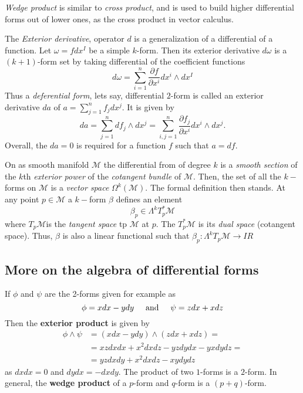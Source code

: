 \textit{Wedge product} is similar to \textit{cross product}, and is used to build higher differential forms out of lower ones, as the cross product in vector calculus.

The \textit{Exterior derivative}, operator $d$ is a generalization of a differential of a function. 
Let $\omega=fdx^I$ be a simple $k$-form. Then its exterior derivative $d\omega$ is a $(k+1)$-form set by taking differential of the coefficient functions
\begin{equation}
d\omega = \sum_{i=1}^n \frac{\partial f}{\partial x^i}dx^i \wedge dx^I
\end{equation}
Thus a \textit{deferential form}, lets say, differential $2$-form is called an exterior derivative $da$ of $a=\sum_{j=1}^{n}f_j dx^j$. 
It is given by
\begin{equation}
da = \sum_{j=1}^n df_j \wedge dx^j = \sum_{i,j=1}^n \frac{\partial f_j}{\partial x^i}dx^i\wedge dx^j.
\end{equation}
Overall, the $da=0$ is required for a function $f$ such that $a=df$.

On as smooth manifold $\mathcal{M}$ the differential from of degree $k$ is a \textit{smooth section} of the $k$th \textit{exterior power} of the \textit{cotangent bundle} of $\mathcal{M}$. 
Then, the set of all the $k-$forms on $\mathcal{M}$ is a \textit{vector space} $\Omega^k(\mathcal{M})$. 
The formal definition then stands. At any point $p\in \mathcal{M}$ a $k-$form $\beta$ defines an element 
\begin{equation}
\beta_p\in\Lambda^kT^* _p \mathcal{M}
\end{equation}
where $T_p\mathcal{M}$is the \textit{tangent space} tp $\mathcal{M}$ at $p$. The $T^* _p \mathcal{M}$ is its \textit{dual space} (cotangent space). Thus, $\beta$ is also a linear functional such that $\beta_p:\Lambda^k T_p \mathcal{M}\rightarrow I\!R$


\subsection{More on the algebra of differential forms}

If $\phi$ and $\psi$ are the 2-forms given for example as 
\begin{equation}
\phi = x dx - y dy \hspace{5mm} \text{and} \hspace{5mm}\psi = z dx + x dz
\end{equation}
Then the \textbf{exterior product} is given by 
\begin{align}
\phi\wedge\psi &= (x dx - y dy)\wedge(zdx + xdz) = \\
&=xzdxdx+x^2dxdz-yzdydx-yxdydz= \\
&=yzdxdy + x^2 dx dz - xydydz
\end{align}
as $dxdx=0$ and $dydx=-dxdy$. 
The product of two $1$-forms is a $2$-form.
In general, the \textbf{wedge product} of a $p$-form and $q$-form is a $(p+q)$-form.


